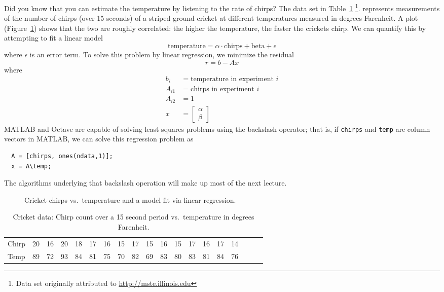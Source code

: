 \documentclass[12pt, leqno]{article}
\begin{document}
Did you know that you can estimate the temperature by listening to the
rate of chirps?  The data set in Table~\ref{table1}%
\footnote{Data set originally attributed to
  \url{http://mste.illinois.edu}}.  represents measurements of the
number of chirps (over 15 seconds) of a striped ground cricket at
different temperatures measured in degrees Farenheit.  A plot
(Figure~\ref{fig2}) shows that the two are roughly correlated: the
higher the temperature, the faster the crickets chirp.  We can
quantify this by attempting to fit a linear model
\[
  \mbox{temperature} = \alpha \cdot \mbox{chirps} + \mbox{beta} + \epsilon
\]
where $\epsilon$ is an error term.  To solve this problem by linear
regression, we minimize the residual
\[
  r = b-Ax
\]
where
\begin{align*}
  b_{i} &= \mbox{temperature in experiment } i \\
  A_{i1} &= \mbox{chirps in experiment } i \\
  A_{i2} &= 1 \\
  x &= \begin{bmatrix} \alpha \\ \beta \end{bmatrix}
\end{align*}
MATLAB and Octave are capable of solving least squares problems using
the backslash operator; that is, if {\tt chirps} and {\tt temp} are
column vectors in MATLAB, we can solve this regression problem as
\begin{lstlisting}
  A = [chirps, ones(ndata,1)];
  x = A\temp;
\end{lstlisting}
The algorithms underlying that backslash operation will make up
most of the next lecture.

\begin{figure}
  \begin{center}
  \end{center}
  \caption{Cricket chirps vs.~temperature and a model fit via
    linear regression.}
  \label{fig2}
\end{figure}

\begin{table}
  \small
  \begin{tabular}{l|cccccccccccccccccc}
    Chirp &
    20& 16& 20& 18& 17& 16& 15& 17& 15& 16& 15& 17& 16& 17& 14 \\
    Temp &
    89& 72& 93& 84& 81& 75& 70& 82& 69& 83& 80& 83& 81& 84& 76
  \end{tabular}
  \caption{Cricket data: Chirp count over a 15 second period vs.~temperature
    in degrees Farenheit.}
  \label{table1}
\end{table}
\end{document}
